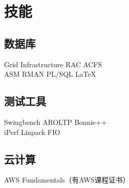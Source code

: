 \documentclass[]{deedy-resume-openfont}
\begin{document}
\begin{minipage}[t]{0.25\textwidth}

\section{技能}
\sectionsep
\subsection{数据库}
Grid Infrastructure \textbullet{} RAC \textbullet{} ACFS \\
ASM \textbullet{} RMAN \textbullet{} PL/SQL \textbullet{} \LaTeX\ \\


\subsection{测试工具}
Swingbench \textbullet{} AROLTP \textbullet{} Bonnie++  \\
iPerf \textbullet{} Linpack \textbullet{} FIO  \\
\sectionsep

\subsection{云计算}
AWS Fundamentals（有AWS课程证书）

%
%

\end{minipage} 
\hfill
\end{document}
